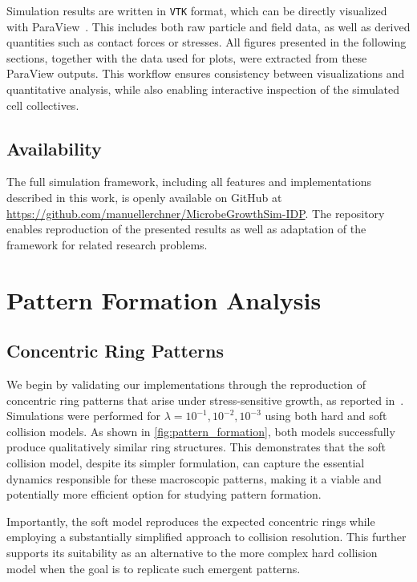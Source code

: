 \documentclass[conference]{IEEEtran}
\begin{document}
Simulation results are written in \texttt{VTK} format, which can be directly visualized with ParaView~\cite{ahrens2005paraview}. This includes both raw particle and field data, as well as derived quantities such as contact forces or stresses.
All figures presented in the following sections, together with the data used for plots, were extracted from these ParaView outputs. This workflow ensures consistency between visualizations and quantitative analysis, while also enabling interactive inspection of the simulated cell collectives.


\subsection{Availability}

The full simulation framework, including all features and implementations described in this work, is openly available on GitHub at \url{https://github.com/manuellerchner/MicrobeGrowthSim-IDP}.
The repository enables reproduction of the presented results as well as adaptation of the framework for related research problems.

\section{Pattern Formation Analysis}

\subsection{Concentric Ring Patterns}

We begin by validating our implementations through the reproduction of concentric ring patterns that arise under stress-sensitive growth, as reported in~\cite{Weady2024}. Simulations were performed for $\lambda = 10^{-1}, 10^{-2}, 10^{-3}$ using both hard and soft collision models. As shown in \autoref{fig:pattern_formation}, both models successfully produce qualitatively similar ring structures. This demonstrates that the soft collision model, despite its simpler formulation, can capture the essential dynamics responsible for these macroscopic patterns, making it a viable and potentially more efficient option for studying pattern formation.

Importantly, the soft model reproduces the expected concentric rings while employing a substantially simplified approach to collision resolution. This further supports its suitability as an alternative to the more complex hard collision model when the goal is to replicate such emergent patterns.
\end{document}
